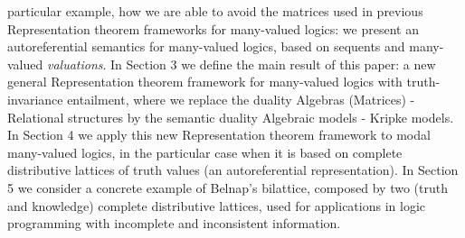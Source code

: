 \documentclass[10pt,twocolumn]{article}
\begin{document}
particular example, how we are able to avoid the matrices used
 in previous Representation theorem frameworks for many-valued logics: we present an autoreferential semantics for many-valued logics, based on
 sequents and many-valued \emph{valuations}. In Section 3 we
define the main result of this paper: a new general
 Representation theorem framework for many-valued logics with truth-invariance entailment, where we replace the duality
Algebras (Matrices) - Relational structures by the semantic duality
Algebraic models - Kripke models.
 In Section 4 we  apply this new Representation theorem framework  to
 modal many-valued logics, in the particular case when it is based on complete distributive lattices of truth
 values (an autoreferential representation). In Section 5 we consider a concrete example
 of Belnap's bilattice, composed by two (truth and knowledge) complete distributive lattices, used for  applications in logic programming
 with incomplete and inconsistent information.
\end{document}
